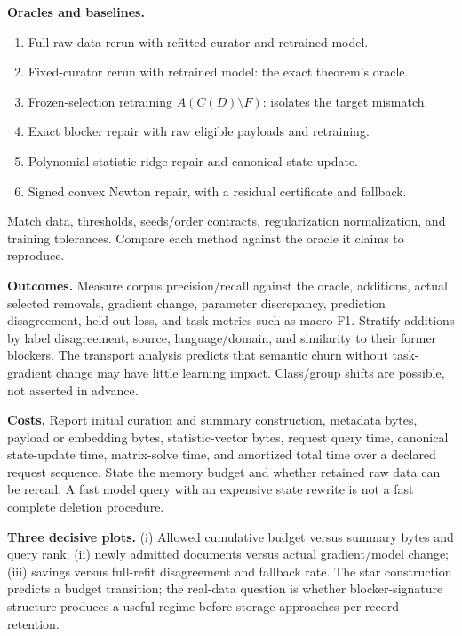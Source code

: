 \documentclass[11pt,a4paper]{article}
\theoremstyle{definition}\newtheorem{definition}[theorem]{Definition}
\newcommand{\minus}{\setminus}
\begin{document}
\textbf{Oracles and baselines.}
\begin{enumerate}
\item Full raw-data rerun with refitted curator and retrained model.
\item Fixed-curator rerun with retrained model: the exact theorem's oracle.
\item Frozen-selection retraining $A(C(D)\minus F)$: isolates the target mismatch.
\item Exact blocker repair with raw eligible payloads and retraining.
\item Polynomial-statistic ridge repair and canonical state update.
\item Signed convex Newton repair, with a residual certificate and fallback.
\end{enumerate}
Match data, thresholds, seeds/order contracts, regularization normalization, and training tolerances. Compare each method against the oracle it claims to reproduce.

\textbf{Outcomes.} Measure corpus precision/recall against the oracle, additions, actual selected removals, gradient change, parameter discrepancy, prediction disagreement, held-out loss, and task metrics such as macro-F1. Stratify additions by label disagreement, source, language/domain, and similarity to their former blockers. The transport analysis predicts that semantic churn without task-gradient change may have little learning impact. Class/group shifts are possible, not asserted in advance.

\textbf{Costs.} Report initial curation and summary construction, metadata bytes, payload or embedding bytes, statistic-vector bytes, request query time, canonical state-update time, matrix-solve time, and amortized total time over a declared request sequence. State the memory budget and whether retained raw data can be reread. A fast model query with an expensive state rewrite is not a fast complete deletion procedure.

\textbf{Three decisive plots.} (i) Allowed cumulative budget versus summary bytes and query rank; (ii) newly admitted documents versus actual gradient/model change; (iii) savings versus full-refit disagreement and fallback rate. The star construction predicts a budget transition; the real-data question is whether blocker-signature structure produces a useful regime before storage approaches per-record retention.
\end{document}
